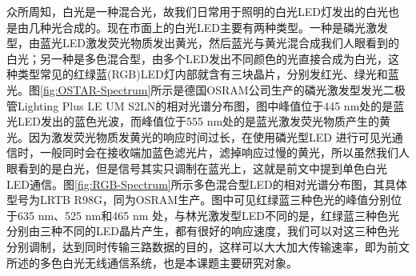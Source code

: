 众所周知，白光是一种混合光，故我们日常用于照明的白光LED灯发出的白光也是由几种光合成的。现在市面上的白光LED主要有两种类型。一种是磷光激发型，由蓝光LED激发荧光物质发出黄光，然后蓝光与黄光混合成我们人眼看到的白光；另一种是多色混合型，由多个LED发出不同颜色的光直接合成为白光，这种类型常见的红绿蓝(RGB)LED灯内部就含有三块晶片，分别发红光、绿光和蓝光。图\ref{fig:OSTAR-Spectrum}所示是德国OSRAM公司生产的磷光激发型发光二极管Lighting Plus LE UM S2LN的相对光谱分布图\cite{LE2011}，图中峰值位于445 nm处的是蓝光LED发出的蓝色光波，而峰值位于555 nm处的是蓝光激发荧光物质产生的黄光。因为激发荧光物质发黄光的响应时间过长，在使用磷光型LED 进行可见光通信时，一般同时会在接收端加蓝色滤光片，滤掉响应过慢的黄光，所以虽然我们人眼看到的是白光，但是信号其实只调制在蓝光上，这就是前文中提到单色白光LED通信。图\ref{fig:RGB-Spectrum}所示多色混合型LED的相对光谱分布图\citep{LRTB2011}，其具体型号为LRTB R98G，同为OSRAM生产。图中可见红绿蓝三种色光的峰值分别位于635 nm、525 nm和465 nm 处，与林光激发型LED不同的是，红绿蓝三种色光分别由三种不同的LED晶片产生，都有很好的响应速度，我们可以对这三种色光分别调制，达到同时传输三路数据的目的，这样可以大大加大传输速率，即为前文所述的多色白光无线通信系统，也是本课题主要研究对象。


